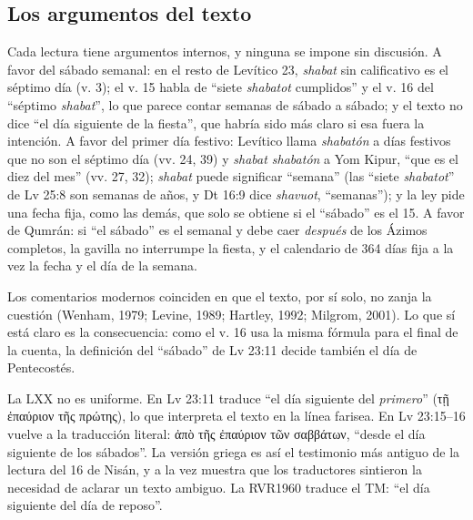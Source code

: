 \documentclass[11pt,letterpaper]{article}
\newcommand{\grc}[1]{\foreignlanguage{ancientgreek}{#1}}
\begin{document}
\subsection{Los argumentos del texto}
Cada lectura tiene argumentos internos, y ninguna se impone sin discusión. A favor del sábado semanal: en el resto de Levítico 23, \emph{shabat} sin calificativo es el séptimo día (v. 3); el v. 15 habla de ``siete \emph{shabatot} cumplidos'' y el v. 16 del ``séptimo \emph{shabat}'', lo que parece contar semanas de sábado a sábado; y el texto no dice ``el día siguiente de la fiesta'', que habría sido más claro si esa fuera la intención. A favor del primer día festivo: Levítico llama \emph{shabatón} a días festivos que no son el séptimo día (vv. 24, 39) y \emph{shabat shabatón} a Yom Kipur, ``que es el diez del mes'' (vv. 27, 32); \emph{shabat} puede significar ``semana'' (las ``siete \emph{shabatot}'' de Lv 25:8 son semanas de años, y Dt 16:9 dice \emph{shavuot}, ``semanas''); y la ley pide una fecha fija, como las demás, que solo se obtiene si el ``sábado'' es el 15. A favor de Qumrán: si ``el sábado'' es el semanal y debe caer \emph{después} de los Ázimos completos, la gavilla no interrumpe la fiesta, y el calendario de 364 días fija a la vez la fecha y el día de la semana.

Los comentarios modernos coinciden en que el texto, por sí solo, no zanja la cuestión (Wenham, 1979; Levine, 1989; Hartley, 1992; Milgrom, 2001). Lo que sí está claro es la consecuencia: como el v. 16 usa la misma fórmula para el final de la cuenta, la definición del ``sábado'' de Lv 23:11 decide también el día de Pentecostés.

\begin{nota}
La LXX no es uniforme. En Lv 23:11 traduce ``el día siguiente del \emph{primero}'' (\grc{τῇ ἐπαύριον τῆς πρώτης}), lo que interpreta el texto en la línea farisea. En Lv 23:15--16 vuelve a la traducción literal: \grc{ἀπὸ τῆς ἐπαύριον τῶν σαββάτων}, ``desde el día siguiente de los sábados''. La versión griega es así el testimonio más antiguo de la lectura del 16 de Nisán, y a la vez muestra que los traductores sintieron la necesidad de aclarar un texto ambiguo. La RVR1960 traduce el TM: ``el día siguiente del día de reposo''.
\end{nota}
\end{document}
